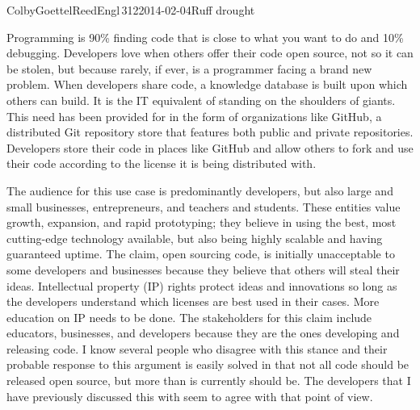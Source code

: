 \documentclass[12pt]{article}
\begin{document}
\begin{mla}{Colby}{Goettel}{Reed}{Engl\,312}{2014-02-04}{Ruff drought}


Programming is 90\% finding code that is close to what you want to do and 10\% debugging. Developers love when others offer their code open source, not so it can be stolen, but because rarely, if ever, is a programmer facing a brand new problem. When developers share code, a knowledge database is built upon which others can build. It is the IT equivalent of standing on the shoulders of giants. This need has been provided for in the form of organizations like GitHub, a distributed Git repository store that features both public and private repositories. Developers store their code in places like GitHub and allow others to fork and use their code according to the license it is being distributed with.

The audience for this use case is predominantly developers, but also large and small businesses, entrepreneurs, and teachers and students. These entities value growth, expansion, and rapid prototyping; they believe in using the best, most cutting-edge technology available, but also being highly scalable and having guaranteed uptime. The claim, open sourcing code, is initially unacceptable to some developers and businesses because they believe that others will steal their ideas. Intellectual property (IP) rights protect ideas and innovations so long as the developers understand which licenses are best used in their cases. More education on IP needs to be done. The stakeholders for this claim include educators, businesses, and developers because they are the ones developing and releasing code. I know several people who disagree with this stance and their probable response to this argument is easily solved in that not all code should be released open source, but more than is currently should be. The developers that I have previously discussed this with seem to agree with that point of view.

\end{mla}
\end{document}
